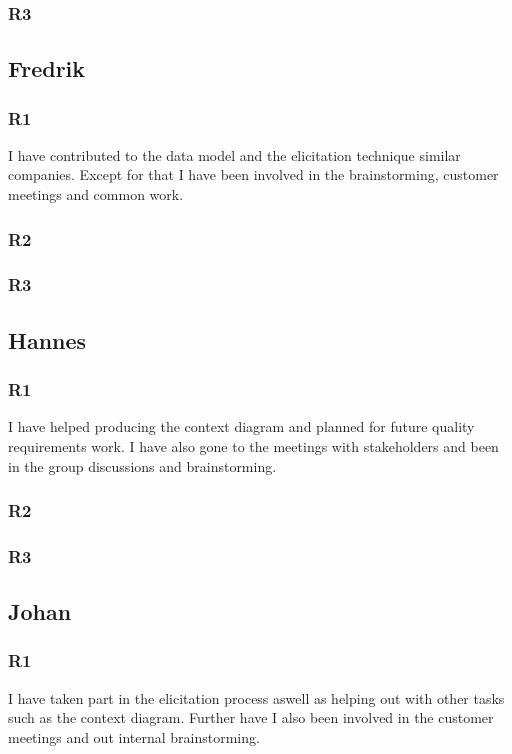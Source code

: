 \documentclass[a4paper]{article}
\begin{document}
    \subsubsection{R3}
	
  \subsection{Fredrik}
    \subsubsection{R1}
    I have contributed to the data model and the elicitation technique similar companies. Except for that I have been involved in the brainstorming, customer meetings and common work.
    \subsubsection{R2}
    \subsubsection{R3}
  	
  \subsection{Hannes}
    \subsubsection{R1}
    I have helped producing the context diagram and planned for future quality requirements work. I have also gone to the meetings with stakeholders and been in the group discussions and brainstorming.
    \subsubsection{R2}
    \subsubsection{R3}
  
  \subsection{Johan}
    \subsubsection{R1}
    I have taken part in the elicitation process aswell as helping out with other tasks such as the context diagram. Further have I also been involved in the customer meetings and out internal brainstorming.
\end{document}

